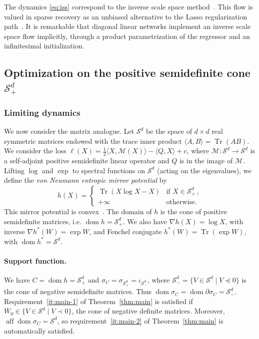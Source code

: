 \documentclass[11pt,english,reqno]{article}
\DeclareMathOperator{\Tr}{Tr}
\DeclareMathOperator{\dom}{dom}
\DeclareMathOperator{\aff}{aff}
\theoremstyle{plain}
\theoremstyle{definition}
\theoremstyle{remark}
\numberwithin{equation}{section}
\begin{document}
The dynamics \eqref{eq:iss} correspond to the inverse scale space method~\cite{burger2005nonlinear,burger2007error,burger2013adaptive}. This flow is valued in sparse recovery as an unbiased alternative to the Lasso regularization path~\cite{osher2016sparse}. It is remarkable that diagonal linear networks implement an inverse scale space flow implicitly, through a product parametrization of the regressor and an infinitesimal initialization.

\subsection{Optimization on the positive semidefinite cone \texorpdfstring{$\mathcal{S}^d_+$}{}}
\label{subsec:matrix}

\subsubsection{Limiting dynamics}
 
We now consider the matrix analogue. Let $\mathcal{S}^{d}$ be the space of $d \times d$ real symmetric matrices endowed with the trace inner product $\langle A, B \rangle = \Tr(AB)$. We consider the loss $\ell(X) = \frac{1}{2} \langle X, \mathcal{M}(X) \rangle - \langle Q, X \rangle + c$, where $\mathcal{M} : \mathcal{S}^d \to \mathcal{S}^d$ is a self-adjoint positive semidefinite linear operator and $Q$ is in the image of $\mathcal{M}$. Lifting $\log$ and $\exp$ to spectral functions on $\mathcal{S}^d$ (acting on the eigenvalues), we define the \emph{von Neumann entropic mirror potential} by
%
\begin{equation*}
	h(X) =
	\begin{cases}
		\Tr(X \log X - X) & \text{if } X \in \mathcal{S}^{d}_+ \, ,\\
		+\infty & \text{otherwise.}
	\end{cases}
\end{equation*}
%
This mirror potential is convex~\cite[Theorem 4.3.5]{bhatia2009positive}. The domain of $h$ is the cone of positive semidefinite matrices, i.e. $\dom h = \mathcal{S}^{d}_+$. We also have $\nabla h(X) = \log X$, with inverse $\nabla h^*(W) = \exp W$, and Fenchel conjugate $h^*(W) = \Tr(\exp W)$, with $\dom h^* = \mathcal{S}^d$.
 
\paragraph{Support function.} We have $C = \dom h = \mathcal{S}^{d}_+$ and $\sigma_C = \sigma_{\mathcal{S}^{d}_+} = \iota_{\mathcal{S}^{d}_-}$, where $\mathcal{S}^{d}_- = \{V \in \mathcal{S}^d \mid V \preceq 0\}$ is the cone of negative semidefinite matrices. Thus $\dom \sigma_C = \dom \partial \sigma_C = \mathcal{S}^{d}_-$. Requirement~\ref{it:main-1} of Theorem~\ref{thm:main} is satisfied if $\overline{W}_0 \in \{V \in \mathcal{S}^d \mid V \prec 0\}$, the cone of negative definite matrices. Moreover, $\aff \dom \sigma_C = \mathcal{S}^d$, so requirement~\ref{it:main-2} of Theorem~\ref{thm:main} is automatically satisfied.
 
\end{document}
